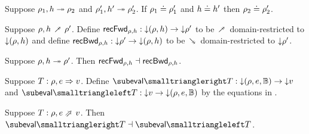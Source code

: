\begin{lemma}
    Suppose $\rho_1, h \mathrel{\twoheadrightarrow} \rho_2$ and $\rho_1', h' \mathrel{\twoheadrightarrow} \rho_2'$. If $\rho_1 \doteq \rho_1'$ and $h \doteq h'$ then $\rho_2 \doteq \rho_2'$.
\end{lemma}

\begin{definition}
   Suppose $\rho, h \closeDefsFwdR \rho'$. Define $\mathsf{recFwd}_{\rho,h}: {\downarrow}{(\rho, h)} \to {\downarrow}{\rho'}$ to be $\closeDefsFwdR$ domain-restricted to ${\downarrow}{(\rho, h)}$ and define $\mathsf{recBwd}_{\rho,h}: {\downarrow}{\rho'} \to {\downarrow}{(\rho, h)}$ to be $\closeDefsBwdR$ domain-restricted to ${\downarrow}{\rho'}$.
\end{definition}

\begin{theorem}
\label{thm:core-language:closeDefs:gc}
   Suppose $\rho, h \mathrel{\twoheadrightarrow} \rho'$.  Then $\mathsf{recFwd}_{\rho,h} \dashv \mathsf{recBwd}_{\rho,h}$.
\end{theorem}

\begin{definition}
   Suppose $T: \rho, e \mathrel{\Rightarrow} v$. Define $\evalFwdF{T}: \Below{(\rho, e, \Bool)} \to \Below{v}$ and $\evalBwdF{T}: \Below{v} \to \Below{(\rho, e, \Bool)}$ by the equations in .
\end{definition}

\begin{theorem}
\label{thm:core-language:eval:gc}
   Suppose $T: \rho, e \evalFwdS v$.  Then $\evalFwdF{T} \adjoint \evalBwdF{T}$.
\end{theorem}
